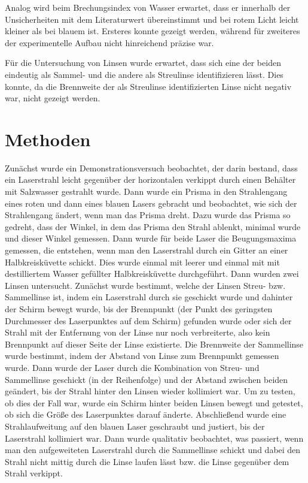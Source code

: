 \documentclass[
	a4paper,
	12pt,
	pagesize,
	ngerman
]{scrartcl}
\begin{document}
	Analog wird beim Brechungsindex von Wasser erwartet, dass er innerhalb der Unsicherheiten mit dem Literaturwert übereinstimmt und bei rotem Licht leicht kleiner als bei blauem ist.
	Ersteres konnte gezeigt werden, während für zweiteres der experimentelle Aufbau nicht hinreichend präzise war.
	
	Für die Untersuchung von Linsen wurde erwartet, dass sich eine der beiden eindeutig als Sammel- und die andere als Streulinse identifizieren lässt.
	Dies konnte, da die Brennweite der als Streulinse identifizierten Linse nicht negativ war, nicht gezeigt werden.
	\section{Methoden}
	Zunächst wurde ein Demonstrationsversuch beobachtet, der darin bestand, dass ein Laserstrahl leicht gegenüber der horizontalen verkippt durch einen Behälter mit Salzwasser gestrahlt wurde.
	Dann wurde ein Prisma in den Strahlengang eines roten und dann eines blauen Lasers gebracht und beobachtet, wie sich der Strahlengang ändert, wenn man das Prisma dreht.
	Dazu wurde das Prisma so gedreht, dass der Winkel, in dem das Prisma den Strahl ablenkt, minimal wurde und dieser Winkel gemessen.
	Dann wurde für beide Laser die Beugungsmaxima gemessen, die entstehen, wenn man den Laserstrahl durch ein Gitter an einer Halbkreisküvette schickt.
	Dies wurde einmal mit leerer und einmal mit mit destilliertem Wasser gefüllter Halbkreisküvette durchgeführt.
	Dann wurden zwei Linsen untersucht.
	Zunächst wurde bestimmt, welche der Linsen Streu- bzw. Sammellinse ist, indem ein Laserstrahl durch sie geschickt wurde und dahinter der Schirm bewegt wurde, bis der Brennpunkt (der Punkt des geringsten Durchmesser des Laserpunktes auf dem Schirm) gefunden wurde oder sich der Strahl mit der Entfernung von der Linse nur noch verbreiterte, also kein Brennpunkt auf dieser Seite der Linse existierte.
	Die Brennweite der Sammellinse wurde bestimmt, indem der Abstand von Linse zum Brennpunkt gemessen wurde.
	Dann wurde der Laser durch die Kombination von Streu- und Sammellinse geschickt (in der Reihenfolge) und der Abstand zwischen beiden geändert, bis der Strahl hinter den Linsen wieder kollimiert war.
	Um zu testen, ob dies der Fall war, wurde ein Schirm hinter beiden Linsen bewegt und getestet, ob sich die Größe des Laserpunktes darauf änderte.
	Abschließend wurde eine Strahlaufweitung auf den blauen Laser geschraubt und justiert, bis der Laserstrahl kollimiert war.
	Dann wurde qualitativ beobachtet, was passiert, wenn man den aufgeweiteten Laserstrahl durch die Sammellinse schickt und dabei den Strahl nicht mittig durch die Linse laufen lässt bzw. die Linse gegenüber dem Strahl verkippt.
	
\end{document}
